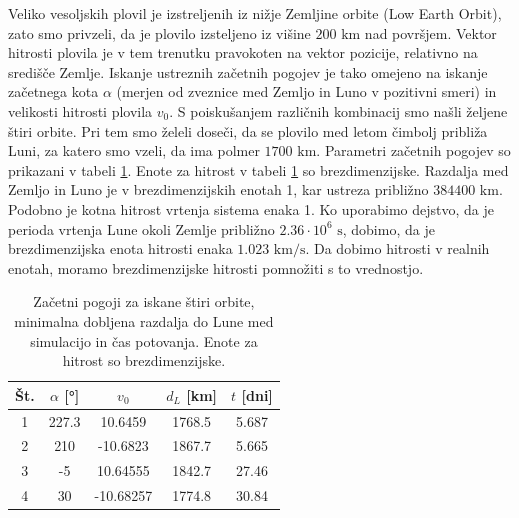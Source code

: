 \documentclass[11pt, titlepage]{article}
\begin{document}
Veliko vesoljskih plovil je izstreljenih iz nižje Zemljine orbite (Low Earth Orbit), zato smo privzeli, da je plovilo izsteljeno iz višine $200 \text{ km}$ nad površjem. Vektor hitrosti plovila je v tem trenutku pravokoten na vektor pozicije, relativno na središče Zemlje. Iskanje ustreznih začetnih pogojev
je tako omejeno na iskanje začetnega kota $\alpha$ (merjen od zveznice med Zemljo in Luno v pozitivni smeri) in velikosti hitrosti plovila $v_0$. S poiskušanjem različnih kombinacij smo našli željene štiri orbite. Pri tem smo želeli doseči, da se plovilo med letom čimbolj približa Luni, za katero smo vzeli, da ima polmer $1700 \text{ km}$. Parametri začetnih pogojev
so prikazani v tabeli \ref{tab:initial_conditions}.
Enote za hitrost v tabeli \ref{tab:initial_conditions} so brezdimenzijske. Razdalja med Zemljo in Luno je v brezdimenzijskih enotah 1, kar ustreza približno $384400 \text{ km}$. Podobno je kotna hitrost vrtenja sistema enaka 1. 
Ko uporabimo dejstvo, da je perioda vrtenja Lune okoli Zemlje približno $2.36 \cdot 10^6 \text{ s}$, dobimo, da je brezdimenzijska enota hitrosti enaka $1.023 \text{ km/s}$.
Da dobimo hitrosti v realnih enotah, moramo brezdimenzijske hitrosti pomnožiti s to vrednostjo.
\begin{table}[H]
    \centering
    \begin{tabular}{|c|c|c|c|c|}
        \hline
        \textbf{Št.} & $\alpha$ [°] & $v_0$ & $d_L$ [km] & $t$ [dni] \\
        \hline
        1 & 227.3 & 10.6459 & 1768.5 & 5.687\\
        2 & 210 & -10.6823 & 1867.7 & 5.665\\
        3 & -5 & 10.64555 & 1842.7 & 27.46\\
        4 & 30 & -10.68257 & 1774.8 & 30.84\\
        \hline
    \end{tabular}
    \caption{Začetni pogoji za iskane štiri orbite, minimalna dobljena razdalja do Lune med simulacijo in čas potovanja. Enote za hitrost so brezdimenzijske.}
    \label{tab:initial_conditions}
\end{table}
\end{document}
